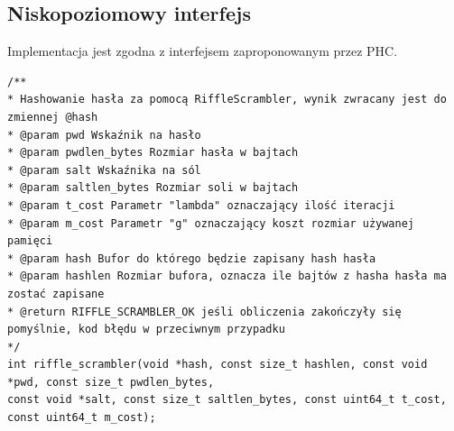 \subsection{Niskopoziomowy interfejs}
Implementacja jest zgodna z interfejsem zaproponowanym przez PHC.
\begin{verbatim}
/**
* Hashowanie hasła za pomocą RiffleScrambler, wynik zwracany jest do zmiennej @hash
* @param pwd Wskaźnik na hasło
* @param pwdlen_bytes Rozmiar hasła w bajtach
* @param salt Wskaźnika na sól
* @param saltlen_bytes Rozmiar soli w bajtach
* @param t_cost Parametr "lambda" oznaczający ilość iteracji
* @param m_cost Parametr "g" oznaczający koszt rozmiar używanej pamięci
* @param hash Bufor do którego będzie zapisany hash hasła
* @param hashlen Rozmiar bufora, oznacza ile bajtów z hasha hasła ma zostać zapisane
* @return RIFFLE_SCRAMBLER_OK jeśli obliczenia zakończyły się pomyślnie, kod błędu w przeciwnym przypadku
*/
int riffle_scrambler(void *hash, const size_t hashlen, const void *pwd, const size_t pwdlen_bytes,
const void *salt, const size_t saltlen_bytes, const uint64_t t_cost, const uint64_t m_cost);
\end{verbatim}


